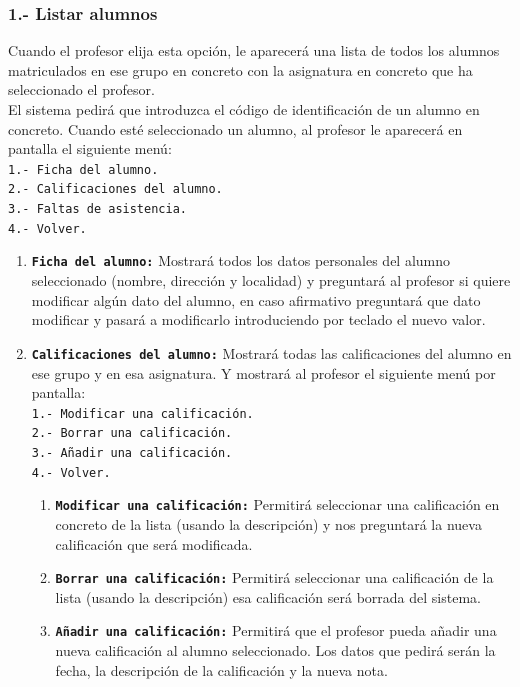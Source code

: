 \documentclass{book}
\begin{document}
\subsubsection{1.- Listar alumnos}{
Cuando el profesor elija esta opción, le aparecerá una lista de todos los alumnos matriculados en ese grupo en concreto con la asignatura en concreto que ha seleccionado el profesor.\\
El sistema pedirá que introduzca el código de identificación de un alumno en concreto. Cuando esté seleccionado un alumno, al profesor le aparecerá en pantalla el siguiente menú:\\
\texttt{1.- Ficha del alumno.}\\
\texttt{2.- Calificaciones del alumno.}\\
\texttt{3.- Faltas de asistencia.}\\
\texttt{4.- Volver.}
\begin{enumerate}
	\item \textbf{\texttt{Ficha del alumno:}} Mostrará todos los datos personales del alumno seleccionado (nombre, dirección y localidad) y preguntará al profesor si quiere modificar algún dato del alumno, en caso afirmativo preguntará que dato modificar y pasará a modificarlo introduciendo por teclado el nuevo valor.
	\item \textbf{\texttt{Calificaciones del alumno:}} Mostrará todas las calificaciones del alumno en ese grupo y en esa asignatura. Y mostrará al profesor el siguiente menú por pantalla:\\
	\texttt{1.- Modificar una calificación.}\\
	\texttt{2.- Borrar una calificación.}\\
	\texttt{3.- Añadir una calificación.}\\
	\texttt{4.- Volver.}
	\begin{enumerate}
		\item \textbf{\texttt{Modificar una calificación:}} Permitirá seleccionar una calificación en concreto de la lista (usando la descripción) y nos preguntará la nueva calificación que será modificada.
		\item \textbf{\texttt{Borrar una calificación:}} Permitirá seleccionar una calificación de la lista (usando la descripción)  esa calificación será borrada del sistema.
		\item \textbf{\texttt{Añadir una calificación:}} Permitirá que el profesor pueda añadir una nueva calificación al alumno seleccionado. Los datos que pedirá serán la fecha, la descripción de la calificación y la nueva nota.

\end{enumerate}
\end{enumerate}}
\end{document}
